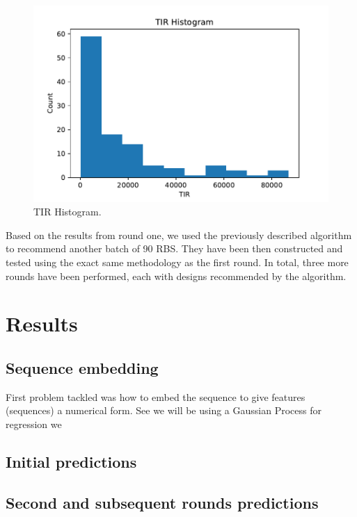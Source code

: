 \documentclass{article}
\begin{document}
\begin{figure}[t]
    \centering
    \includegraphics[scale=0.7]{plots/TIR_histogram.pdf}
    \caption{TIR Histogram.}
    \label{fig: TIR Histogram.}
\end{figure}

Based on the results from round one, we used the previously described algorithm to recommend another batch of 90 RBS. They have been then constructed and tested using the exact same methodology as the first round. In total, three more rounds have been performed, each with designs recommended by the algorithm. 

\section{Results}

\subsection{Sequence embedding}
First problem tackled was how to embed the sequence to give features (sequences) a numerical form. See we will be using a Gaussian Process for regression we \cite{Ben-Hur2008}

\subsection{Initial predictions}

\subsection{Second and subsequent rounds predictions}
\end{document}
